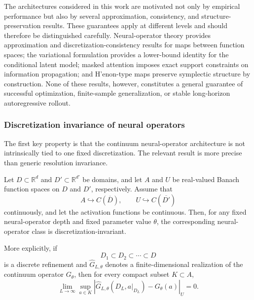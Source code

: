 \documentclass[11pt,a4paper]{article}
\begin{document}
\begin{sloppypar}
The architectures considered in this work are motivated not only by empirical performance but also by several approximation, consistency, and structure-preservation results. These guarantees apply at different levels and should therefore be distinguished carefully. Neural-operator theory provides approximation and discretization-consistency results for maps between function spaces; the variational formulation provides a lower-bound identity for the conditional latent model; masked attention imposes exact support constraints on information propagation; and H'enon-type maps preserve symplectic structure by construction. None of these results, however, constitutes a general guarantee of successful optimization, finite-sample generalization, or stable long-horizon autoregressive rollout.

\subsubsection{Discretization invariance of neural operators}

The first key property is that the continuum neural-operator architecture is not intrinsically tied to one fixed discretization. The relevant result is more precise than generic resolution invariance.

\begin{theorem}
Let $D\subset\mathbb{R}^{d}$ and $D'\subset\mathbb{R}^{d'}$ be domains, and let $A$ and $U$ be real-valued Banach function spaces on $D$ and $D'$, respectively. Assume that
\begin{equation}
A \hookrightarrow C(\overline{D}),
\qquad
U \hookrightarrow C(\overline{D'})
\end{equation}
continuously, and let the activation functions be continuous. Then, for any fixed neural-operator depth and fixed parameter value $\theta$, the corresponding neural-operator class is discretization-invariant.
\end{theorem}

More explicitly, if
\begin{equation}
D_1
\subset
D_2
\subset
\cdots
\subset D
\end{equation}
is a discrete refinement and $\widehat{G}_{L,\theta}$ denotes a finite-dimensional realization of the continuum operator $G_\theta$, then for every compact subset $K\subset A$,
\begin{equation}
\lim_{L\to\infty}
\sup_{a\in K}
\left|
\widehat{G}_{L,\theta}
\left(
D_L,
a|_{D_L}
\right)
-
G_\theta(a)
\right|_{U}
=
0.
\label{eq:theorem-discretization-invariance}
\end{equation}


\end{sloppypar}
\end{document}
